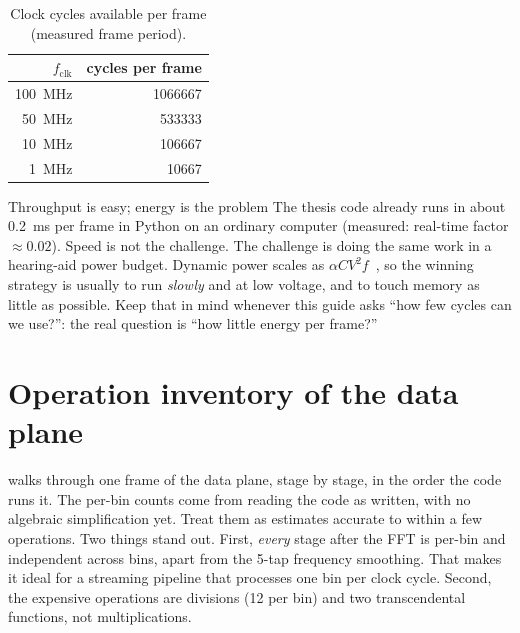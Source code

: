 \begin{table}[htbp]
\centering\small
\caption{Clock cycles available per frame (measured frame period).}
\label{tab:workload:cycles}
\begin{tabular}{@{}rr@{}}
\toprule
$f_\text{clk}$ & cycles per frame \\
\midrule
\qty{100}{\MHz} & \num{1066667} \\
\qty{50}{\MHz}  & \num{533333} \\
\qty{10}{\MHz}  & \num{106667} \\
\qty{1}{\MHz}   & \num{10667} \\
\bottomrule
\end{tabular}
\end{table}

\begin{conceptbox}{Throughput is easy; energy is the problem}
The thesis code already runs in about \qty{0.2}{\ms} per frame in Python on an
ordinary computer (measured: real-time factor $\approx 0.02$). Speed is not the
challenge. The challenge is doing the same work in a hearing-aid power budget.
Dynamic power scales as $\alpha C V^2 f$~\cite{chandrakasan1992lowpower}, so the
winning strategy is usually to run \emph{slowly} and at low voltage, and to touch
memory as little as possible. Keep that in mind whenever this guide asks
\enquote{how few cycles can we use?}: the real question is \enquote{how little
energy per frame?}
\end{conceptbox}

\section{Operation inventory of the data plane}\label{sec:workload:ops}

 walks through one frame of the data plane, stage by
stage, in the order the code runs it. The per-bin counts come from reading the
code as written, with no algebraic simplification yet. Treat them as estimates
accurate to within a few operations. Two things stand out. First, \emph{every}
stage after the FFT is per-bin and independent across bins, apart from the
5-tap frequency smoothing. That makes it ideal for a streaming pipeline that
processes one bin per clock cycle. Second, the expensive operations are
divisions (12 per bin) and two transcendental functions, not
multiplications.


